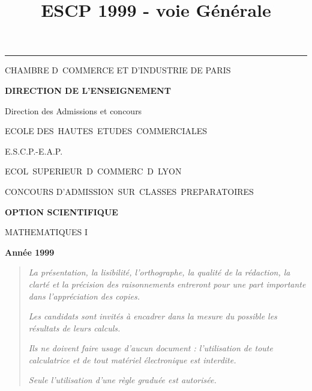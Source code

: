\documentclass[11pt]{article}%
\title{\bf \vspace{-2cm} ESCP 1999 - voie Générale} %
\author{} %
\date{} %
\begin{document}
\maketitle %
\vspace{-1.4cm}\hrule %
\thispagestyle{fancy}

\vspace*{.2cm}




\begin{center}
{\small CHAMBRE D\E\ COMMERCE ET D'INDUSTRIE DE PARIS}

\textbf{DIRECTION DE L'ENSEIGNEMENT}

Direction des Admissions et concours

\underline{\hspace*{3cm}}

{\Large ECOLE DES\ HAUTES\ ETUDES\ COMMERCIALES}

{\Large E.S.C.P.-E.A.P.}

{\Large ECOL\E\ SUPERIEUR\E\ D\E\ COMMERC\E\ D\E\ LYON}{\large }

CONCOURS D'ADMISSION\ SUR\ CLASSES\ PREPARATOIRES

\underline{\hspace*{3cm}}

\textbf{OPTION SCIENTIFIQUE}

{\Large MATHEMATIQUES I}

\textbf{Année 1999}

\underline{\hspace*{3cm}}
\end{center}

\begin{quotation}
\noindent \textsl{La présentation, la lisibilité, l'orthographe, la
qualité
de la rédaction, la clarté et la précision des raisonnements entreront
pour
une part importante dans l'appréciation des copies.}

\noindent \textsl{Les candidats sont invités à encadrer dans la mesure
du
possible les résultats de leurs calculs.}

\noindent \textsl{Ils ne doivent faire usage d'aucun document :
l'utilisation de toute calculatrice et de tout matériel électronique
est
interdite.}

\noindent \textsl{Seule l'utilisation d'une règle graduée est
autorisée.}

\noindent \textsl{\hrulefill }
\end{quotation}
\end{document}
